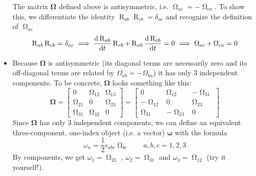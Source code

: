 \documentclass[11pt, a4paper]{article}
\newcommand{\mat}[1]{\mathbf{#1}}
\begin{document}
\begin{itemize}
	The matrix $ \mathbf{\Omega} $ defined above is antisymmetric, i.e. $ \operatorname{\Omega}_{ac} = - \operatorname{\Omega}_{ca} $. To show this, we differentiate the identity $ \operatorname{R}_{ab}\operatorname{R}_{cb} = \delta_{a c} $ and recognize the definition of $ \operatorname{\Omega}_{ac} $
	\begin{equation*}
		\operatorname{R}_{ab}\operatorname{R}_{cb} = \delta_{a c} \implies \dv{\operatorname{R}_{ab}}{t}\operatorname{R}_{cb} + \operatorname{R}_{ab}\dv{\operatorname{R}_{cb}}{t} = 0 \implies \operatorname{\Omega}_{ac} + \operatorname{\Omega}_{ca} = 0
	\end{equation*}
	
	\item Because $ \mat{\Omega} $ is antisymmetric (its diagonal terms are necessarily zero and its off-diagonal terms are related by $ \Omega_{ab} = - \Omega_{ba} $) it has only 3 independent components. To be concrete, $ \mat{\Omega} $ looks something like this:
	\begin{equation*}
		\mat{\Omega} = 
		\begin{bmatrix}
			0 & \operatorname{\Omega}_{12} & \operatorname{\Omega}_{13}\\
			\operatorname{\Omega}_{21} & 0 & \operatorname{\Omega}_{23}\\
			\operatorname{\Omega}_{31} & \operatorname{\Omega}_{32} & 0
		\end{bmatrix}
		= 
		\begin{bmatrix}
			0 & \operatorname{\Omega}_{12} & - \operatorname{\Omega}_{31}\\-
			\operatorname{\Omega}_{12} & 0 & \operatorname{\Omega}_{23}\\
			\operatorname{\Omega}_{31} & -\operatorname{\Omega}_{23} & 0
		\end{bmatrix}
	\end{equation*}
	Since $ \mat{\Omega} $ has only 3 independent components, we can define an equivalent three-component, one-index object (i.e. a vector) $ \bm{\omega} $ with the formula
	\begin{equation*}
		 \omega_{a} = \frac{1}{2} \epsilon_{abc} \operatorname{\Omega}_{bc} \qquad a, b, c = 1, 2, 3
	\end{equation*}
	By components, we get $ \omega_{1} = \operatorname{\Omega}_{23}$ , $ \omega_{2} = \operatorname{\Omega}_{31} $ and $ \omega_{3} = \operatorname{\Omega}_{12} $ (try it yourself!).
	

\end{itemize}
\end{document}
